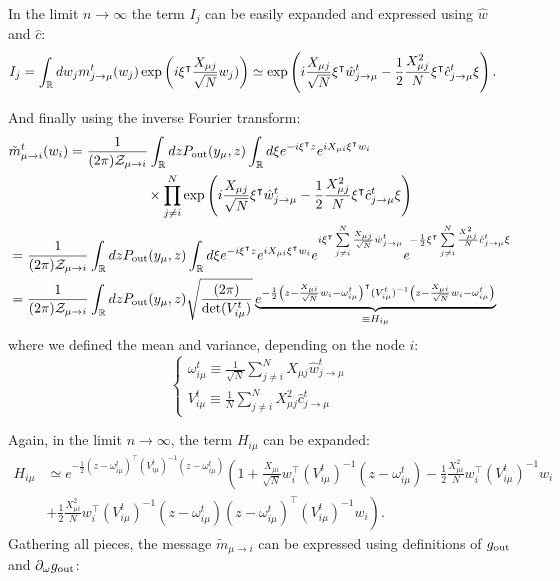 \documentclass[aip,jmp,amsmath,amssymb,reprint]{revtex4}
\begin{document}
In the limit $n\to \infty$ the term $I_j$ can be easily expanded and expressed using $\hat{w}$ and $\hat{c}$:
\begin{align*}
 I_j &= \int_{\mathbb{R}} dw_j
		 m_{j \to \mu}^t (w_j ) \exp\left( i  \xi^\intercal \frac{X_{\mu j}}{\sqrt{N}} w_j ) \right) \simeq  \exp\left( i \frac{X_{\mu j}}{\sqrt{N}}\xi^\intercal  \hat{w}_{j\to \mu}^t -  \frac{1}{2}\frac{X_{\mu j}^2}{N} \xi^\intercal  \hat{c}_{j\to \mu}^t  \xi\right) .
\end{align*} 

And finally using the inverse Fourier transform:
\begin{align*}
&\tilde{m}_{\mu \to i}^t (w_i ) = 
\frac{1}{(2\pi)\mathcal{Z}_{\mu \to i}}
\int_{\mathbb{R}} dz P_{\rm out}(y_\mu , z ) 
\int_{\mathbb{R}} d \xi  
e^{-i \xi^\intercal z}
e^{ i X_{\mu i} \xi^\intercal w_i} \\
&\qquad\qquad\qquad\qquad\qquad\times\prod\limits_{j\neq i}^N  \exp\left( i \frac{X_{\mu j}}{\sqrt{N}} \xi^\intercal \hat{w}_{j\to \mu}^t -  \frac{1}{2}\frac{X_{\mu j}^2}{N} \xi^\intercal \hat{c}_{j\to \mu}^t \xi\right) \\
&= \frac{1}{(2\pi)\mathcal{Z}_{\mu\to i}}
\int_{\mathbb{R}} dz
P_{\rm out}(y_\mu , z )
\int_{\mathbb{R}} d \xi  
e^{-i \xi^\intercal z}
e^{ i X_{\mu i} \xi^\intercal w_i} e^{i \xi^\intercal \sum\limits_{j\neq i}^N \frac{X_{\mu j}}{\sqrt{N}} \hat{w}_{j\to \mu}^t } e^{-  \frac{1}{2} \xi^\intercal \sum\limits_{j\neq i}^N \frac{X_{\mu j}^2}{N}   \hat{c}_{j \to \mu }^t\xi} \\
&= \frac{1}{(2\pi)\mathcal{Z}_{\mu\to i}} \int_{\mathbb{R}} dzP_{\rm out}(y_\mu , z)\sqrt{\frac{(2\pi)}{\det(V_{i \mu }^t)}} \underbrace{e^{-\frac{1}{2} \left( z -\frac{X_{\mu i}}{\sqrt{N}} w_i -\omega_{i \mu}^t \right)^\intercal (V_{i \mu }^t)^{-1} \left( z -\frac{X_{\mu i}}{\sqrt{N}} w_i -\omega_{i \mu}^t \right)}}_{\equiv H_{i\mu}}
\end{align*}
where we defined the mean and variance, depending on the node $i$:
\begin{equation*}
	\begin{cases}
	\omega_{i \mu}^t \equiv  \frac{1}{\sqrt{N}} \sum\limits_{j\neq i}^N X_{\mu j}  \hat{w}_{j\to \mu}^t \\
		V_{i\mu}^t \equiv  \frac{1}{N} \sum\limits_{j\neq i}^N X_{\mu j}^2  \hat{c}_{j \to \mu}^t
	\end{cases}
\end{equation*}


Again, in the limit $n\to \infty$, the term $H_{i\mu}$ can be expanded:
\begin{align*}
	H_{i\mu} &\simeq   e^{-\frac{1}{2} \left( z -\omega_{i \mu}^t \right)^\intercal (V_{i\mu}^t)^{-1} \left( z -\omega_{i \mu}^t \right) } 
	\left( 1 + \frac{X_{\mu i}}{\sqrt{N}} w_i^\intercal (V_{i\mu}^t)^{-1} (z -\omega_{i \mu}^t) -\frac{1}{2}\frac{X_{\mu i}^2}{N} w_i^\intercal (V_{i\mu}^t)^{-1} w_i \right.\\
& \left. + \frac{1}{2} \frac{X_{\mu i}^2}{N} w_i^\intercal (V_{i\mu}^t)^{-1} (z -\omega_{i \mu}^t)(z -\omega_{i \mu}^t)^\intercal  (V_{i\mu}^t)^{-1} w_i \right).
\end{align*}
Gathering all pieces, the message $\tilde{m}_{\mu \to i}$ can be expressed using definitions of $g_{\rm out}$ and $\partial_{\omega} g_{\rm out}$:
\end{document}
